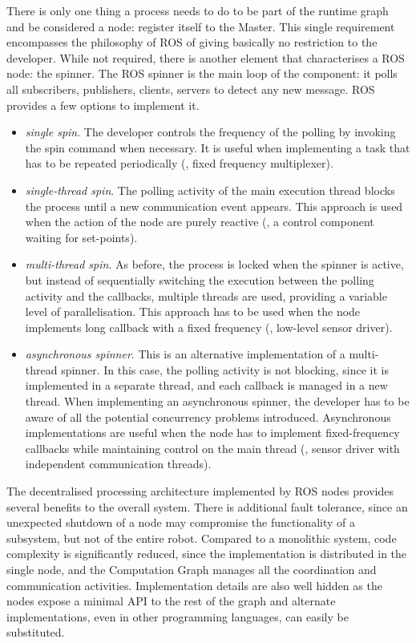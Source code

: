 There is only one thing a process needs to do to be part of the runtime graph and be considered a node: register itself to the Master. This single requirement encompasses the philosophy of ROS of giving basically no restriction to the developer. While not required, there is another element that characterises a ROS node: the spinner. The ROS spinner is the main loop of the component: it polls all subscribers, publishers, clients, servers to detect any new message. ROS provides a few options to implement it.
\begin{itemize}
\item \textit{single spin}. The developer controls the frequency of the polling by invoking the spin command when necessary. It is useful when implementing a task that has to be repeated periodically (\eg, fixed frequency multiplexer).
\item \textit{single-thread spin}. The polling activity of the main execution thread blocks the process until a new communication event appears. This approach is used when the action of the node are purely reactive (\eg, a control component waiting for set-points).
\item \textit{multi-thread spin}. As before, the process is locked when the spinner is active, but instead of sequentially switching the execution between the polling activity and the callbacks, multiple threads are used, providing a variable level of parallelisation. This approach has to be used when the node implements long callback with a fixed frequency (\eg, low-level sensor driver).
\item \textit{asynchronous spinner}. This is an alternative implementation of a multi-thread spinner. In this case, the polling activity is not blocking, since it is implemented in a separate thread, and each callback is managed in a new thread. When implementing an asynchronous spinner, the developer has to be aware of all the potential concurrency problems introduced. Asynchronous implementations are useful when the node has to implement fixed-frequency callbacks while maintaining control on the main thread (\eg, sensor driver with independent communication threads).
\end{itemize}

The decentralised processing architecture implemented by ROS nodes provides several benefits to the overall system. There is additional fault tolerance, since an unexpected shutdown of a node may compromise the functionality of a subsystem, but not of the entire robot. Compared to a monolithic system, code complexity is significantly reduced, since the implementation is distributed in the single node, and the Computation Graph manages all the coordination and communication activities. Implementation details are also well hidden as the nodes expose a minimal API to the rest of the graph and alternate implementations, even in other programming languages, can easily be substituted.

